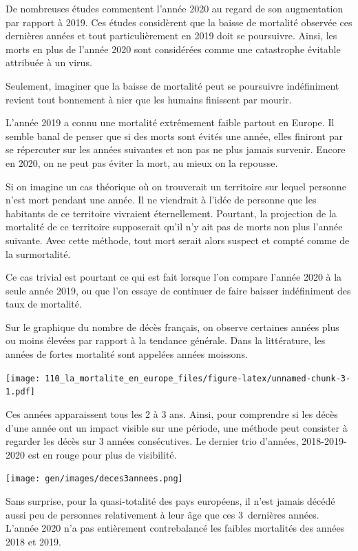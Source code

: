 \documentclass[
]{article}
\begin{document}
De nombreuses études commentent l'année 2020 au regard de son
augmentation par rapport à 2019. Ces études considèrent que la baisse de
mortalité observée ces dernières années et tout particulièrement en 2019
doit se poursuivre. Ainsi, les morts en plus de l'année 2020 sont
considérées comme une catastrophe évitable attribuée à un virus.

Seulement, imaginer que la baisse de mortalité peut se poursuivre
indéfiniment revient tout bonnement à nier que les humains finissent par
mourir.

L'année 2019 a connu une mortalité extrêmement faible partout en Europe.
Il semble banal de penser que si des morts sont évités une année, elles
finiront par se répercuter sur les années suivantes et non pas ne plus
jamais survenir. Encore en 2020, on ne peut pas éviter la mort, au mieux
on la repousse.

Si on imagine un cas théorique où on trouverait un territoire sur lequel
personne n'est mort pendant une année. Il ne viendrait à l'idée de
personne que les habitants de ce territoire vivraient éternellement.
Pourtant, la projection de la mortalité de ce territoire supposerait
qu'il n'y ait pas de morts non plus l'année suivante. Avec cette
méthode, tout mort serait alors suspect et compté comme de la
surmortalité.

Ce cas trivial est pourtant ce qui est fait lorsque l'on compare l'année
2020 à la seule année 2019, ou que l'on essaye de continuer de faire
baisser indéfiniment des taux de mortalité.

Sur le graphique du nombre de décès français, on observe certaines
années plus ou moins élevées par rapport à la tendance générale. Dans la
littérature, les années de fortes mortalité sont appelées années
moissons.

\texttt{[image: 110\_la\_mortalite\_en\_europe\_files/figure-latex/unnamed-chunk-3-1.pdf]}

Ces années apparaissent tous les 2 à 3 ans. Ainsi, pour comprendre si
les décès d'une année ont un impact visible sur une période, une méthode
peut consister à regarder les décès sur 3 années consécutives. Le
dernier trio d'années, 2018-2019-2020 est en rouge pour plus de
visibilité.

\texttt{[image: gen/images/deces3annees.png]}

Sans surprise, pour la quasi-totalité des pays européens, il n'est
jamais décédé aussi peu de personnes relativement à leur âge que ces
3~dernières années. L'année 2020 n'a pas entièrement contrebalancé les
faibles mortalités des années 2018 et 2019.
\end{document}
